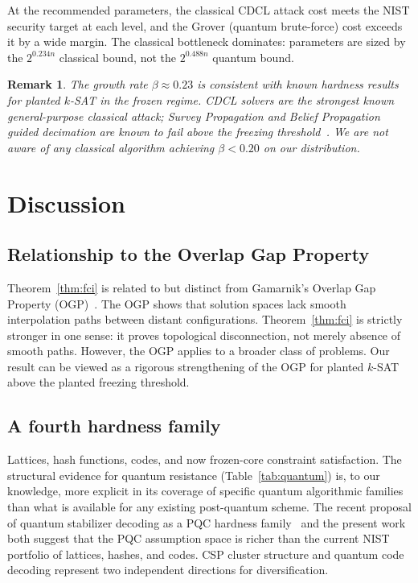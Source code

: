 \documentclass[11pt]{article}
\newtheorem{remark}[theorem]{Remark}
\begin{document}
At the recommended parameters, the classical CDCL attack cost meets the NIST security target at each level, and the Grover (quantum brute-force) cost exceeds it by a wide margin.  The classical bottleneck dominates: parameters are sized by the $2^{0.234n}$ classical bound, not the $2^{0.488n}$ quantum bound.

\begin{remark}
The growth rate $\beta \approx 0.23$ is consistent with known hardness results for planted $k$-SAT in the frozen regime.  CDCL solvers are the strongest known general-purpose classical attack; Survey Propagation and Belief Propagation guided decimation are known to fail above the freezing threshold~\cite{ACO08}.  We are not aware of any classical algorithm achieving $\beta < 0.20$ on our distribution.
\end{remark}


\section{Discussion}

\subsection{Relationship to the Overlap Gap Property}

Theorem~\ref{thm:fci} is related to but distinct from Gamarnik's Overlap Gap Property (OGP)~\cite{Gam21}.  The OGP shows that solution spaces lack smooth interpolation paths between distant configurations.  Theorem~\ref{thm:fci} is strictly stronger in one sense: it proves topological disconnection, not merely absence of smooth paths.  However, the OGP applies to a broader class of problems.  Our result can be viewed as a rigorous strengthening of the OGP for planted $k$-SAT above the planted freezing threshold.


\subsection{A fourth hardness family}

Lattices, hash functions, codes, and now frozen-core constraint satisfaction.  The structural evidence for quantum resistance (Table~\ref{tab:quantum}) is, to our knowledge, more explicit in its coverage of specific quantum algorithmic families than what is available for any existing post-quantum scheme.  The recent proposal of quantum stabilizer decoding as a PQC hardness family~\cite{LPQR26} and the present work both suggest that the PQC assumption space is richer than the current NIST portfolio of lattices, hashes, and codes.  CSP cluster structure and quantum code decoding represent two independent directions for diversification.
\end{document}
